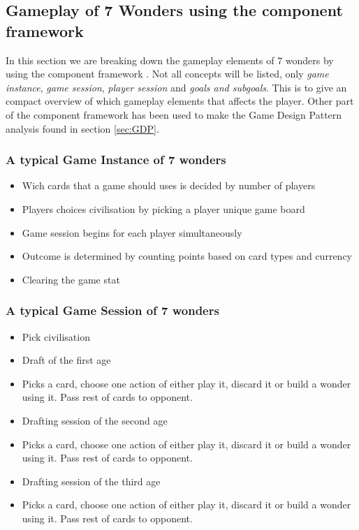 \documentclass[a4paper]{article}
\begin{document}
\subsection{Gameplay of 7 Wonders using the component framework}
\label{sec:gpCompFrame7wond}
In this section we are breaking down the gameplay elements of 7 wonders by using the component framework \cite{bjork2003describing}. 
Not all concepts will be listed, only \textit{game instance}, \textit{game session}, \textit{player session} and \textit{goals and subgoals}. 
This is to give an compact overview of which gameplay elements that affects the player. Other part of the component framework has been used to make the Game Design Pattern analysis found in section \ref{sec:GDP}.

\subsubsection{A typical Game Instance of 7 wonders}
\begin{itemize}[noitemsep,topsep=0pt,parsep=0pt,partopsep=0pt]
  \item Wich cards that a game should uses is decided by number of players
  \item Players choices civilisation by picking a player unique game board
  \item Game session begins for each player simultaneously
  \item Outcome is determined by counting points based on card types and currency
  \item Clearing the game stat
\end{itemize}

\subsubsection{A typical Game Session of 7 wonders}
\begin{itemize}[noitemsep,topsep=0pt,parsep=0pt,partopsep=0pt]
  \item Pick civilisation
  \item Draft of the first age
  \item Picks a card, choose one action of either play it, discard it or build a wonder using it. Pass rest of cards to opponent.
  \item Drafting session of the second age
  \item Picks a card, choose one action of either play it, discard it or build a wonder using it. Pass rest of cards to opponent.
  \item Drafting session of the third age
  \item Picks a card, choose one action of either play it, discard it or build a wonder using it. Pass rest of cards to opponent.
\end{itemize}
\end{document}
